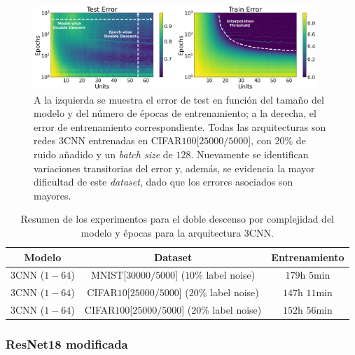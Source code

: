 \begin{figure}[h]
    \centering
    \includegraphics[width=0.95\textwidth]{img/experiments/model-epoch3CNNCIFAR10025k.png}
    \caption[Doble descenso en función del tamaño del modelo y del número de épocas para la red $3$CNN y un subconjunto de CIFAR$100$.]{A la izquierda se muestra el error de test en función del tamaño del modelo y del número de épocas de entrenamiento; a la derecha, el error de entrenamiento correspondiente. Todas las arquitecturas son redes $3$CNN entrenadas en CIFAR$100$[$25000/5000$], con $20\%$ de ruido añadido y un \textit{batch size} de $128$. Nuevamente se identifican variaciones transitorias del error y, además, se evidencia la mayor dificultad de este \textit{dataset}, dado que los errores asociados son mayores.}\label{fig:model-epoch3CNNCIFAR10025k}
\end{figure}

\begin{table}[h!]
    \centering
    \begin{tabular}{|c|c|c|}
    \hline
    \textbf{Modelo}       & \textbf{Dataset} & \textbf{Entrenamiento} \\ 
    \hline
    $3$CNN ($1-64$)      & MNIST[$30000/5000$] ($10$\% label noise)        & $179$h $5$min \\ 
    $3$CNN ($1-64$)      & CIFAR$10$[$25000/5000$]  ($20$\% label noise)   & $147$h $11$min \\
    $3$CNN ($1-64$)      & CIFAR$100$[$25000/5000$]  ($20$\% label noise)   & $152$h $56$min \\
    \hline
    \end{tabular}
    \caption[Resumen de los experimentos para el doble descenso por complejidad del modelo y épocas para la arquitectura $3$CNN.]{Resumen de los experimentos para el doble descenso por complejidad del modelo y épocas para la arquitectura $3$CNN.}\label{tab:3cnn_model-epochwise}
\end{table}

\subsubsection{ResNet18 modificada}\label{subsubsec:model-epoch-wise-ResNet18 modificada}

